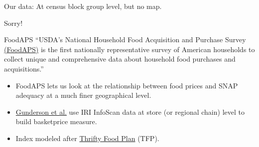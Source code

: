 \documentclass{beamer}
\begin{document}
\begin{frame}

\begin{center}\href{http://garretchristensen.shinyapps.io/Food_Price_Maps}{}

\vskip0.25in
\hrulefill

\vskip0.25in
Our data: At census block group level, but no map. 

Sorry!
\end{center}
\end{frame}

\begin{frame}{FoodAPS}
``USDA's National Household Food Acquisition and Purchase Survey \href{https://www.ers.usda.gov/data-products/foodaps-national-household-food-acquisition-and-purchase-survey.aspx}{(FoodAPS)} is the first nationally representative survey of American households to collect unique and comprehensive data about household food purchases and acquisitions.''
\begin{itemize}
\item FoodAPS lets us look at the relationship between food prices and SNAP adequacy at a much finer geographical level.
\item  \href{https://www.ers.usda.gov/media/8612/priceindexdata.pdf}{Gunderson et al.} use IRI InfoScan data at store (or regional chain) level to build basketprice measure.
\item Index modeled after \href{https://www.cnpp.usda.gov/sites/default/files/usda_food_plans_cost_of_food/TFP2006Report.pdf}{Thrifty Food Plan} (TFP). 
\end{itemize}
\end{frame}





{
    \begin{frame}[plain]
     \end{frame}
}
\end{document}
